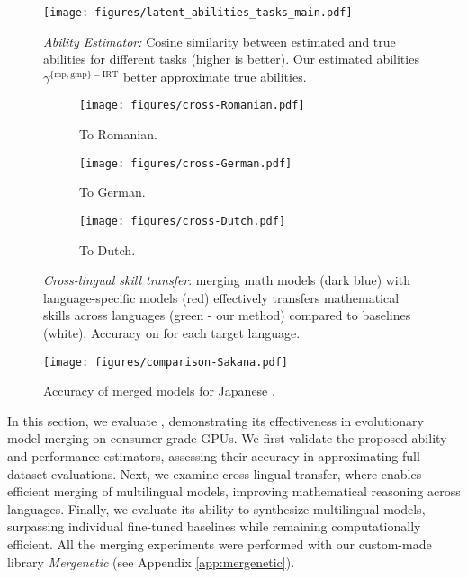 \begin{figure}
    \texttt{[image: figures/latent\_abilities\_tasks\_main.pdf]}
    \caption{\textit{Ability Estimator:} Cosine similarity between estimated and true abilities for different tasks (higher is better). Our estimated abilities $\gamma^{\{\mathrm{mp},\mathrm{gmp}\}-{\mathrm{IRT}}}$ better approximate true abilities.}
    \label{fig:ability-estimator-comparison}
\end{figure}

\begin{figure*}
    \centering
    \begin{subfigure}{0.33\linewidth}
    \texttt{[image: figures/cross-Romanian.pdf]}
    \caption{To Romanian.}
    \label{fig:cross-ro}
    \end{subfigure}
    \hfill
    \begin{subfigure}{0.33\linewidth}
    \texttt{[image: figures/cross-German.pdf]}
    \caption{To German.}
    \label{fig:cross-de}
    \end{subfigure}
    \begin{subfigure}{0.33\linewidth}
    \texttt{[image: figures/cross-Dutch.pdf]}
    \caption{To Dutch.}
    \label{fig:cross-nl}
    \end{subfigure}
    \caption{\textit{Cross-lingual skill transfer}: merging math models (dark blue) with language-specific models (red) effectively transfers mathematical skills across languages (green - our method) compared to baselines (white). Accuracy on  for each target language.
    }
    \label{fig:cross-transfer}
\end{figure*}

\begin{figure}
    \centering
    \texttt{[image: figures/comparison-Sakana.pdf]}
    \caption{Accuracy of merged models for Japanese .}
    \label{fig:evolve-comparison-sakana}
\end{figure}
%
In this section, we evaluate \approachns, demonstrating its effectiveness in evolutionary model merging on consumer-grade GPUs. We first validate the proposed ability and performance estimators, assessing their accuracy in approximating full-dataset evaluations. Next, we examine cross-lingual transfer, where \approach enables efficient merging of multilingual models, improving mathematical reasoning across languages. Finally, we evaluate its ability to synthesize multilingual models, surpassing individual fine-tuned baselines while remaining computationally efficient.
All the merging experiments were performed with our custom-made library \textit{Mergenetic} (see Appendix \ref{app:mergenetic}).

